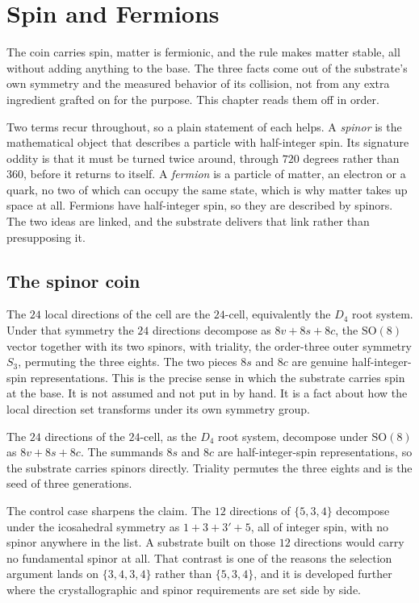 \section{Spin and Fermions}

The coin carries spin, matter is fermionic, and the rule makes matter stable, all without adding anything to the
base. The three facts come out of the substrate's own symmetry and the measured behavior of its collision, not
from any extra ingredient grafted on for the purpose. This chapter reads them off in order.

Two terms recur throughout, so a plain statement of each helps. A \emph{spinor} is the mathematical object that
describes a particle with half-integer spin. Its signature oddity is that it must be turned twice around, through
$720$ degrees rather than $360$, before it returns to itself. A \emph{fermion} is a particle of matter, an
electron or a quark, no two of which can occupy the same state, which is why matter takes up space at all.
Fermions have half-integer spin, so they are described by spinors. The two ideas are linked, and the substrate
delivers that link rather than presupposing it.

\subsection{The spinor coin}

The $24$ local directions of the cell are the $24$-cell, equivalently the $D_4$ root system. Under that symmetry
the $24$ directions decompose as $8v + 8s + 8c$, the $\mathrm{SO}(8)$ vector together with its two spinors,
with triality, the order-three outer symmetry $S_3$, permuting the three eights. The two pieces $8s$ and $8c$ are
genuine half-integer-spin representations. This is the precise sense in which the substrate carries spin at the
base. It is not assumed and not put in by hand. It is a fact about how the local direction set transforms under
its own symmetry group.

\begin{proposition}
The $24$ directions of the $24$-cell, as the $D_4$ root system, decompose under $\mathrm{SO}(8)$ as
$8v + 8s + 8c$. The summands $8s$ and $8c$ are half-integer-spin representations, so the substrate carries
spinors directly. Triality permutes the three eights and is the seed of three generations.
\end{proposition}

The control case sharpens the claim. The $12$ directions of $\{5,3,4\}$ decompose under the icosahedral
symmetry as $1 + 3 + 3' + 5$, all of integer spin, with no spinor anywhere in the list. A substrate built on
those $12$ directions would carry no fundamental spinor at all. That contrast is one of the reasons the selection
argument lands on $\{3,4,3,4\}$ rather than $\{5,3,4\}$, and it is developed further where the crystallographic
and spinor requirements are set side by side.

